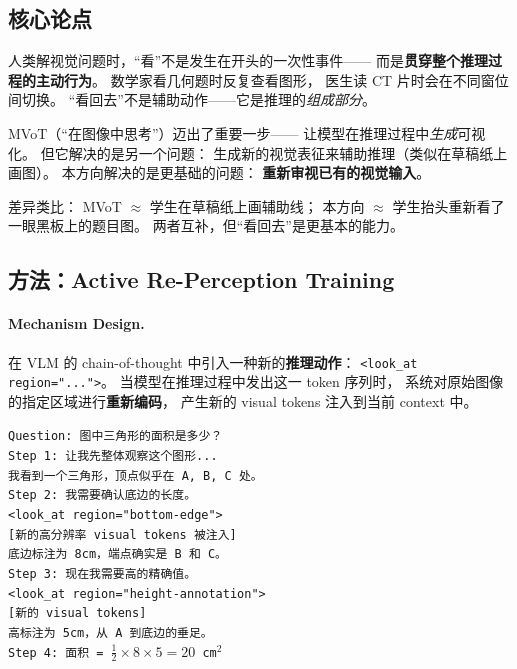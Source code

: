 \documentclass[12pt,a4paper]{article}
\begin{document}
\subsection{核心论点}

\begin{insightbox}
人类解视觉问题时，``看''不是发生在开头的一次性事件——
而是\textbf{贯穿整个推理过程的主动行为}。
数学家看几何题时反复查看图形，
医生读 CT 片时会在不同窗位间切换。
``看回去''不是辅助动作——它是推理的\textit{组成部分}。
\end{insightbox}

\noindent
MVoT（``在图像中思考''）迈出了重要一步——
让模型在推理过程中\textit{生成}可视化。
但它解决的是另一个问题：
生成新的视觉表征来辅助推理（类似在草稿纸上画图）。
本方向解决的是更基础的问题：
\textbf{重新审视已有的视觉输入}。

差异类比：
MVoT $\approx$ 学生在草稿纸上画辅助线；
本方向 $\approx$ 学生抬头重新看了一眼黑板上的题目图。
两者互补，但``看回去''是更基本的能力。

\subsection{方法：Active Re-Perception Training}

\paragraph{Mechanism Design.}
在 VLM 的 chain-of-thought 中引入一种新的\textbf{推理动作}：
\texttt{<look\_at region="...">}。
当模型在推理过程中发出这一 token 序列时，
系统对原始图像的指定区域进行\textbf{重新编码}，
产生新的 visual tokens 注入到当前 context 中。

\begin{tcolorbox}[colback=gray!5,colframe=gray!50,boxrule=0.3pt,left=4pt,right=4pt]
\small
\texttt{Question: 图中三角形的面积是多少？}\\[3pt]
\texttt{Step 1: 让我先整体观察这个图形...}\\
\texttt{我看到一个三角形，顶点似乎在 A, B, C 处。}\\[3pt]
\texttt{Step 2: 我需要确认底边的长度。}\\
\texttt{<look\_at region="bottom-edge">}\\
\texttt{[新的高分辨率 visual tokens 被注入]}\\
\texttt{底边标注为 8cm，端点确实是 B 和 C。}\\[3pt]
\texttt{Step 3: 现在我需要高的精确值。}\\
\texttt{<look\_at region="height-annotation">}\\
\texttt{[新的 visual tokens]}\\
\texttt{高标注为 5cm，从 A 到底边的垂足。}\\[3pt]
\texttt{Step 4: 面积 = $\frac{1}{2} \times 8 \times 5 = 20$ cm$^2$}
\end{tcolorbox}
\end{document}
